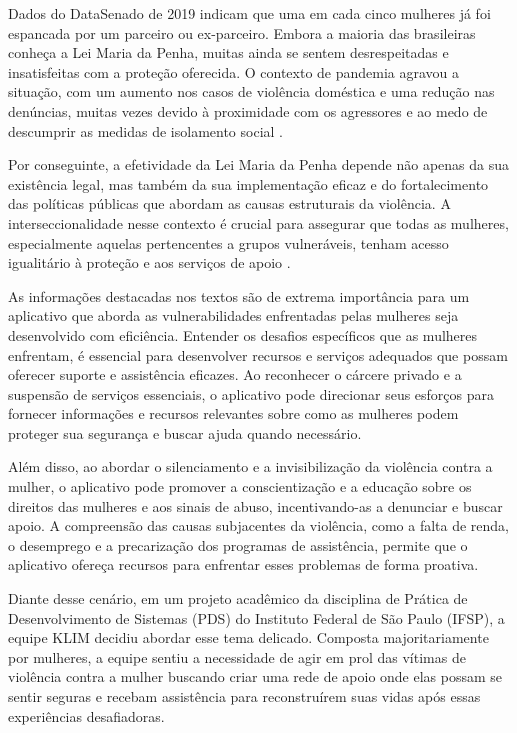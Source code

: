 \documentclass[
    article,			%
    12pt,				%
    oneside,            %
    a4paper,			%
    english,			%
    brazil,				%
    ]{abntex2}
\begin{document}
    Dados do DataSenado de 2019 indicam que uma em cada cinco mulheres já foi espancada por um parceiro ou ex-parceiro. Embora a maioria das brasileiras conheça a Lei Maria da Penha, muitas ainda se sentem desrespeitadas e insatisfeitas com a proteção oferecida. O contexto de pandemia agravou a situação, com um aumento nos casos de violência doméstica e uma redução nas denúncias, muitas vezes devido à proximidade com os agressores e ao medo de descumprir as medidas de isolamento social \cite{lei-covid}.

    Por conseguinte, a efetividade da Lei Maria da Penha depende não apenas da sua existência legal, mas também da sua implementação eficaz e do fortalecimento das políticas públicas que abordam as causas estruturais da violência. A interseccionalidade nesse contexto é crucial para assegurar que todas as mulheres, especialmente aquelas pertencentes a grupos vulneráveis, tenham acesso igualitário à proteção e aos serviços de apoio \cite{LMPavanços_2016}.

    As informações destacadas nos textos são de extrema importância para um aplicativo que aborda as vulnerabilidades enfrentadas pelas mulheres seja desenvolvido com eficiência. Entender os desafios específicos que as mulheres enfrentam, é essencial para desenvolver recursos e serviços adequados que possam oferecer suporte e assistência eficazes. Ao reconhecer o cárcere privado e a suspensão de serviços essenciais, o aplicativo pode direcionar seus esforços para fornecer informações e recursos relevantes sobre como as mulheres podem proteger sua segurança e buscar ajuda quando necessário.

    Além disso, ao abordar o silenciamento e a invisibilização da violência contra a mulher, o aplicativo pode promover a conscientização e a educação sobre os direitos das mulheres e aos sinais de abuso, incentivando-as a denunciar e buscar apoio. A compreensão das causas subjacentes da violência, como a falta de renda, o desemprego e a precarização dos programas de assistência, permite que o aplicativo ofereça recursos para enfrentar esses problemas de forma proativa. 
    
    Diante desse cenário, em um projeto acadêmico da disciplina de Prática de Desenvolvimento de Sistemas (PDS) do Instituto Federal de São Paulo (IFSP), a equipe KLIM decidiu abordar esse tema delicado. Composta majoritariamente por mulheres, a equipe sentiu a necessidade de agir em prol das vítimas de violência contra a mulher buscando criar uma rede de apoio onde elas possam se sentir seguras e recebam assistência para reconstruírem suas vidas após essas experiências desafiadoras.
\end{document}
